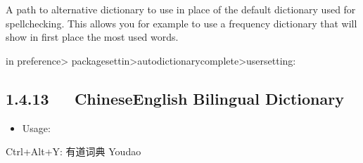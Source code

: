 \documentclass[letterpaper,12pt,english]{sphinxmanual}
\begin{document}
A path to alternative dictionary to use in place of the default
dictionary used for spell\sphinxhyphen{}checking. This allows you for example to use a
frequency dictionary that will show in first place the most used words.

in preference\sphinxhyphen{}> packagesettin\sphinxhyphen{}>autodictionarycomplete\sphinxhyphen{}>user\sphinxhyphen{}setting:

\begin{sphinxVerbatim}[commandchars=\\\{\}]
 
   
             
     
           
        
       
      
\end{sphinxVerbatim}


\subsection{1.4.13   Chinese\sphinxhyphen{}English Bilingual Dictionary}
\label{\detokenize{001software/001install/sublime:chinese-english-bilingual-dictionary}}
\begin{itemize}
\item {} 
Usage:

\end{itemize}

Ctrl+Alt+Y: 有道词典 Youdao
\end{document}

